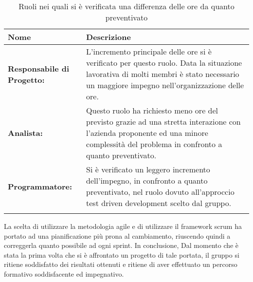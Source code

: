 \setlength{\freewidth}{\dimexpr\textwidth-0\tabcolsep}
	\renewcommand{\arraystretch}{1.5}
	\setlength{\aboverulesep}{0pt}
	\setlength{\belowrulesep}{0pt}
	\begin{longtable}{L{.210\freewidth} L{.6\freewidth} }
		\toprule 
		\textbf{Nome} & \textbf{Descrizione} \\
		\hline
		\textbf{Responsabile di Progetto:} & L'incremento principale delle ore si è verificato per questo ruolo. Data la situazione lavorativa di molti membri è stato necessario un maggiore impegno nell'organizzazione delle ore. \\
				\textbf{Analista:} & Questo ruolo ha richiesto meno ore del previsto grazie ad una stretta interazione con l'azienda proponente ed una minore complessità del problema in confronto a quanto preventivato. \\
		\textbf{Programmatore:} & Si è verificato un leggero incremento dell'impegno, in confronto a quanto preventivato, nel ruolo dovuto all'approccio test driven development scelto dal gruppo. \\	
		\endhead		
		\hiderowcolors
		\caption{Ruoli nei quali si è verificata una differenza delle ore da quanto preventivato}
	\end{longtable}	
La scelta di utilizzare la metodologia agile e di utilizzare il framework scrum ha portato ad una pianificazione più prona al cambiamento, riuscendo quindi a correggerla quanto possibile ad ogni sprint. In conclusione, Dal momento che è stata la prima volta che si è affrontato un progetto di tale portata, il gruppo si ritiene soddisfatto dei risultati ottenuti e ritiene di aver effettuato un percorso formativo soddisfacente ed impegnativo.
	

